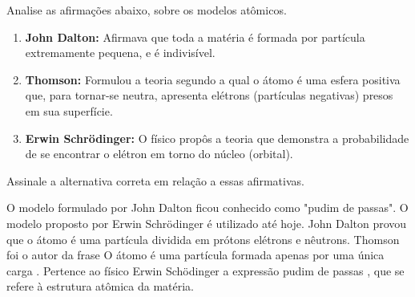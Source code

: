 \documentclass[9 pt]{scrartcl}
\def\PQ{0.84} %
\begin{document}
\begin{exercise}[points=\PQ]
Analise as afirmações abaixo, sobre os modelos atômicos.
\begin{enumerate}
\item \textbf{John Dalton:} Afirmava que toda a matéria é formada por partícula extremamente pequena, e é indivisível.
\item \textbf{Thomson:} Formulou a teoria segundo a qual o átomo é uma esfera positiva que, para tornar-se neutra, apresenta elétrons (partículas negativas) presos em sua superfície.
\item \textbf{Erwin Schrödinger:} O físico propôs a teoria que demonstra a probabilidade de se encontrar o elétron em torno do núcleo (orbital).
\end{enumerate}


Assinale a alternativa correta em relação a essas afirmativas.

\begin{choice}
\choice O modelo formulado por John Dalton ficou conhecido como "pudim de passas".
\choice O modelo proposto por Erwin Schrödinger é utilizado até hoje.
\choice John Dalton provou que o átomo é uma partícula dividida em prótons elétrons e nêutrons.
\choice Thomson foi o autor da frase O átomo é uma partícula formada apenas por uma única carga .
\choice Pertence ao físico Erwin Schödinger a expressão pudim de passas , que se refere à estrutura atômica da matéria.
\end{choice}
\end{exercise}
\end{document}
